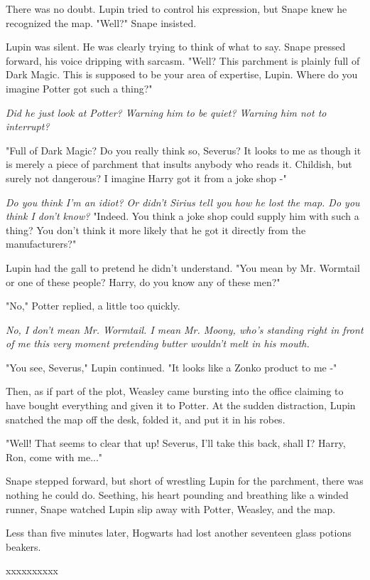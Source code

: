 \documentclass[a4paper,11pt]{article}
\begin{document}
There was no doubt. Lupin tried to control his expression, but Snape knew he recognized the map. "Well?" Snape insisted.

Lupin was silent. He was clearly trying to think of what to say. Snape pressed forward, his voice dripping with sarcasm. "Well? This parchment is plainly full of Dark Magic. This is supposed to be your area of expertise, Lupin. Where do you imagine Potter got such a thing?"

\emph{Did he just look at Potter? Warning him to be quiet? Warning him not to interrupt?}

"Full of Dark Magic? Do you really think so, Severus? It looks to me as though it is merely a piece of parchment that insults anybody who reads it. Childish, but surely not dangerous? I imagine Harry got it from a joke shop -"

\emph{Do you think I'm an idiot? Or didn't Sirius tell you how he lost the map. Do you think I don't know?} "Indeed. You think a joke shop could supply him with such a thing? You don't think it more likely that he got it directly from the manufacturers?"

Lupin had the gall to pretend he didn't understand. "You mean by Mr. Wormtail or one of these people? Harry, do you know any of these men?"

"No," Potter replied, a little too quickly.

\emph{No, I don't mean Mr. Wormtail. I mean Mr. Moony, who's standing right in front of me this very moment pretending butter wouldn't melt in his mouth.}

"You see, Severus," Lupin continued. "It looks like a Zonko product to me -"

Then, as if part of the plot, Weasley came bursting into the office claiming to have bought everything and given it to Potter. At the sudden distraction, Lupin snatched the map off the desk, folded it, and put it in his robes.

"Well! That seems to clear that up! Severus, I'll take this back, shall I? Harry, Ron, come with me..."

Snape stepped forward, but short of wrestling Lupin for the parchment, there was nothing he could do. Seething, his heart pounding and breathing like a winded runner, Snape watched Lupin slip away with Potter, Weasley, and the map.

Less than five minutes later, Hogwarts had lost another seventeen glass potions beakers.

xxxxxxxxxx
\end{document}
